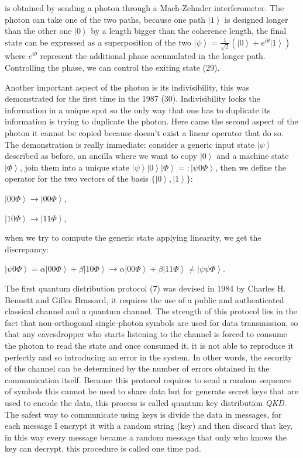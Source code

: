  is obtained by sending a photon through a Mach-Zehnder interferometer. The photon can take one of the two paths, because one path $\left|1\right>$ is designed longer than the other one $\left|0\right>$ by a length bigger than the coherence length, the final state can be expressed as a superposition of the two $\left|\psi\right> = \frac{1}{\sqrt{2}} (\left|0\right> + e^{i\theta}\left|1\right>)$ where $e^{i \theta}$ represent the additional phase accumulated in the longer path. Controlling the phase, we can control the exiting state (29).

Another important aspect of the photon is its indivisibility, this was demonstrated for the first time in the 1987 (30). Indivisibility locks the information in a unique spot so the only way that one has to duplicate its information is trying to duplicate the photon. Here came the second aspect of the photon it cannot be copied because doesn't exist a linear operator that do so. The demonstration is really immediate: consider a generic input state $\left|\psi\right>$ described as before, an ancilla where we want to copy $\left|0\right>$ and a machine state $\left|\Phi\right>$, join them into a unique state $\left|\psi\right>\left|0\right>\left|\Phi\right> =: \left|\psi 0 \Phi\right>$, then we define the operator for the two vectors of the basis $\{\left|0\right>, \left|1\right>\}$:

$\left|0 0 \Phi\right> \to \left|0 0 \Phi\right>$,

$\left|1 0 \Phi\right> \to \left|1 1 \Phi\right>$,

when we try to compute the generic state applying linearity, we get the discrepancy:

$\left|\psi 0 \Phi\right> = \alpha\left|0 0 \Phi\right> + \beta\left|1 0 \Phi\right> \to \alpha\left|0 0 \Phi\right> + \beta\left|1 1 \Phi\right> \ne \left|\psi \psi \Phi\right>$.



The first quantum distribution protocol  (7) was devised in 1984 by Charles H. Bennett and Gilles Brassard, it requires the use of a public and authenticated classical channel and a quantum channel. The strength of this protocol lies in the fact that non-orthogonal single-photon symbols are used for data transmission, so that any eavesdropper who starts listening to the channel is forced to consume the photon to read the state and once consumed it, it is not able to reproduce it perfectly and so introducing an error in the system. In other words, the security of the channel can be determined by the number of errors obtained in the communication itself.  Because this protocol requires to send a random sequence of symbols this cannot be used to share data but for generate secret keys that are used to encode the data, this process is called quantum key distribution \textit{QKD}. The safest way to communicate using keys is divide the data in messages, for each message I encrypt it with a random string (key) and then discard that key, in this way every message became a random message that only who knows the key can decrypt, this procedure is called one time pad.

